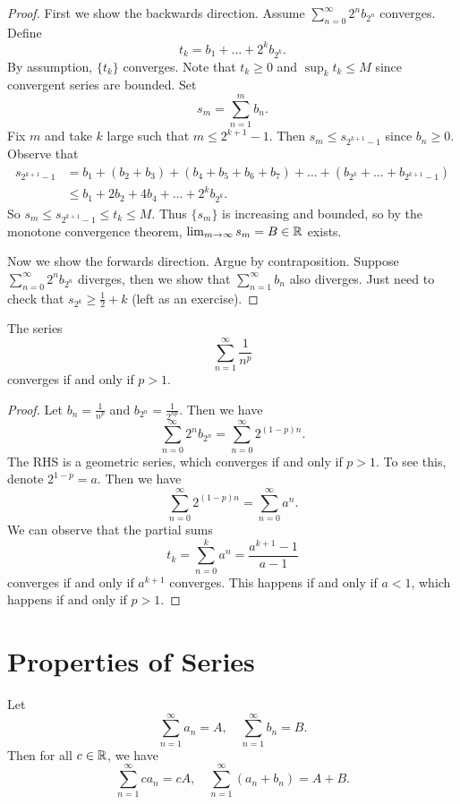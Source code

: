 \begin{proof}
  First we show the backwards direction.
  Assume $\sum_{n = 0}^\infty 2^n b_{2^n}$ converges.
  Define
  \[t_k = b_1 + \dots + 2^k b_{2^k}.\]
  By assumption, $\{t_k\}$ converges.
  Note that $t_k \ge 0$ and $\sup_k t_k \le M$ since
  convergent series are bounded. Set
  \[s_m = \sum_{n=1}^m b_n.\]
  Fix $m$ and take $k$ large such that $m \le 2^{k + 1} - 1$.
  Then $s_m \le s_{2^{k + 1} - 1}$ since $b_n \ge 0$.
  Observe that
  \begin{align*}
    s_{2^{k+1} - 1} &= b_1 + (b_2 + b_3) +
    (b_4 + b_5 + b_6 + b_7) + \dots
    + (b_{2^k} + \dots + b_{2^{k+1} - 1}) \\
    &\le b_1 + 2b_2 + 4b_4 + \dots + 2^k b_{2^k}.
  \end{align*}
  So $s_m \le s_{2^{k + 1} - 1} \le t_k \le M$.
  Thus $\{s_m\}$ is increasing and bounded, so
  by the monotone convergence theorem,
  $\lim_{m \to \infty} s_m = B \in \mathbb{R}$ exists.

  Now we show the forwards direction. Argue
  by contraposition.
  Suppose $\sum_{n = 0}^\infty 2^n b_{2^n}$
  diverges, then we show that $\sum_{n = 1}^\infty b_n$ also
  diverges. Just need to check that
  $s_{2^k} \ge \frac{1}{2} + k$ (left as an exercise).
\end{proof}

\begin{corollary}
  The series
  \[\sum_{n = 1}^\infty \frac{1}{n^p}\]
  converges if and only if $p > 1$.
\end{corollary}

\begin{proof}
  Let $b_n = \frac{1}{n^p}$ and $b_{2^n} = \frac{1}{2^{np}}$.
  Then we have
  \[\sum_{n=0}^\infty 2^n b_{2^n} = \sum_{n=0}^\infty 2^{(1 - p)n}.\]
  The RHS is a geometric series, which converges if and
  only if $p > 1$. To see this, denote $2^{1 - p} = a$.
  Then we have
  \[\sum_{n = 0}^\infty 2^{(1 - p)n} = \sum_{n = 0}^\infty a^n.\]
  We can observe that the partial sums
  \[t_k = \sum_{n=0}^k a^n = \frac{a^{k+1} - 1}{a - 1}\]
  converges if and only if $a^{k + 1}$ converges.
  This happens if and only if $a < 1$, which happens
  if and only if $p > 1$.
\end{proof}

\section{Properties of Series}
\begin{theorem}
  Let
  \[\sum_{n=1}^\infty a_n = A, \quad \sum_{n=1}^\infty b_n = B.\]
  Then for all $c \in \mathbb{R}$, we have
  \[
    \sum_{n=1}^\infty ca_n = cA, \quad
    \sum_{n=1}^\infty (a_n + b_n) = A + B
  .\]
\end{theorem}

